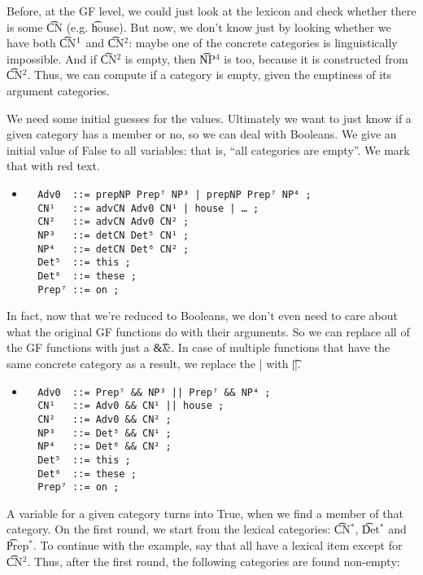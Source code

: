 Before, at the GF level, we could just look at the lexicon and check
whether there is some \t{CN} (e.g. \t{house}). But now, we don't know 
just by looking whether we have both \t{CN$^{\text 1}$} and
\t{CN$^\text{2}$}: maybe one of the concrete categories is
linguistically impossible. And if \t{CN$^\text{2}$} is empty, then
\t{NP$^\text{4}$} is too, because it is constructed from
\t{CN$^\text{2}$}. 
Thus, we can compute if a category is empty, given the emptiness of its argument categories.

We need some initial guesses for the values. Ultimately we want to
just know if a given category has a member or no, so we can deal with
Booleans. We give an initial value of False to all variables: that is,
“all categories are empty”. We mark that with red text.

\begin{itemize}
\item[]
\begin{verbatim}
  Adv0  ::= prepNP Prep⁷ NP³ | prepNP Prep⁷ NP⁴ ;
  CN¹   ::= advCN Adv0 CN¹ | house | … ;
  CN²   ::= advCN Adv0 CN² ;
  NP³   ::= detCN Det⁵ CN¹ ;
  NP⁴   ::= detCN Det⁶ CN² ;
  Det⁵  ::= this ;
  Det⁶  ::= these ;
  Prep⁷ ::= on ;
\end{verbatim}
\end{itemize}

In fact, now that we’re reduced to Booleans, we don’t even need to
care about what the original GF functions do with their arguments. So
we can replace all of the GF functions with just a \t{\&\&}. In case
of multiple functions that have the same concrete category as a
result, we replace the | with \t{||}.

\begin{itemize}
\item[]
\begin{verbatim}
  Adv0  ::= Prep⁷ && NP³ || Prep⁷ && NP⁴ ;
  CN¹   ::= Adv0 && CN¹ || house ;
  CN²   ::= Adv0 && CN² ;
  NP³   ::= Det⁵ && CN¹ ;
  NP⁴   ::= Det⁶ && CN² ;
  Det⁵  ::= this ;
  Det⁶  ::= these ;
  Prep⁷ ::= on ;
\end{verbatim}
\end{itemize}

A variable for a given category turns into True, when we find a member
of that category. On the first round, we start from the lexical
categories: \t{CN$^\text{*}$}, \t{Det$^*$} and \t{Prep$^*$}. To
continue with the example, say that all have a lexical item except for
\t{CN$^\text{2}$}. Thus, after the first round, the following
categories are found non-empty: 

